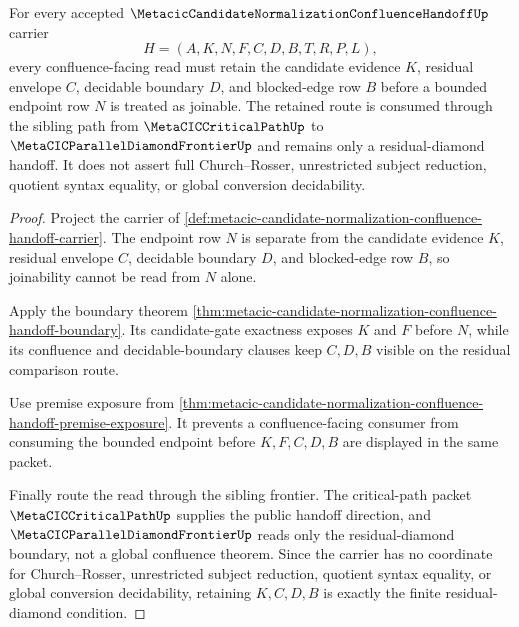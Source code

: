 \begin{theorem}
\label{thm:metacic-candidate-normalization-confluence-handoff-residual-diamond-retention}
For every accepted $\MetacicCandidateNormalizationConfluenceHandoffUp$ carrier
$$
H=(A,K,N,F,C,D,B,T,R,P,L),
$$
every confluence-facing read must retain the candidate evidence $K$, residual envelope $C$, decidable boundary $D$, and blocked-edge row $B$ before a bounded endpoint row $N$ is treated as joinable. The retained route is consumed through the sibling path from $\MetaCICCriticalPathUp$ to $\MetaCICParallelDiamondFrontierUp$ and remains only a residual-diamond handoff. It does not assert full Church--Rosser, unrestricted subject reduction, quotient syntax equality, or global conversion decidability.
\end{theorem}
\begin{proof}
Project the carrier of \autoref{def:metacic-candidate-normalization-confluence-handoff-carrier}. The endpoint row $N$ is separate from the candidate evidence $K$, residual envelope $C$, decidable boundary $D$, and blocked-edge row $B$, so joinability cannot be read from $N$ alone.

Apply the boundary theorem \autoref{thm:metacic-candidate-normalization-confluence-handoff-boundary}. Its candidate-gate exactness exposes $K$ and $F$ before $N$, while its confluence and decidable-boundary clauses keep $C,D,B$ visible on the residual comparison route.

Use premise exposure from \autoref{thm:metacic-candidate-normalization-confluence-handoff-premise-exposure}. It prevents a confluence-facing consumer from consuming the bounded endpoint before $K,F,C,D,B$ are displayed in the same packet.

Finally route the read through the sibling frontier. The critical-path packet $\MetaCICCriticalPathUp$ supplies the public handoff direction, and $\MetaCICParallelDiamondFrontierUp$ reads only the residual-diamond boundary, not a global confluence theorem. Since the carrier has no coordinate for Church--Rosser, unrestricted subject reduction, quotient syntax equality, or global conversion decidability, retaining $K,C,D,B$ is exactly the finite residual-diamond condition.
\end{proof}

